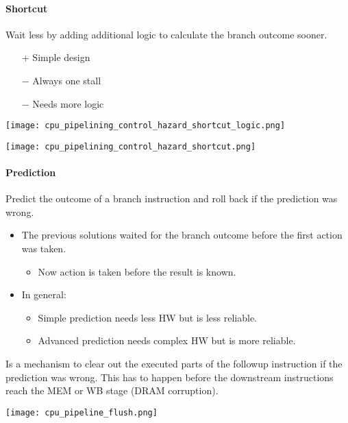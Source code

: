 \paragraph{Shortcut}\label{shortcut}

Wait less by adding additional logic to calculate the branch outcome sooner.

\begin{itemize}
    \item[+] Simple design
    \item[$-$] Always one stall
    \item[$-$] Needs more logic
\end{itemize}

\texttt{[image: cpu\_pipelining\_control\_hazard\_shortcut\_logic.png]}

\texttt{[image: cpu\_pipelining\_control\_hazard\_shortcut.png]}

\paragraph{Prediction}\label{prediction}
Predict the outcome of a branch instruction and roll back if the prediction was wrong.
\begin{itemize}
    \item The previous solutions waited for the branch outcome before the first action was taken.
    \begin{itemize}
        \item Now action is taken before the result is known.
    \end{itemize}
    \item In general: 
    \begin{itemize}
        \item Simple prediction needs less HW but is less reliable.
        \item Advanced prediction needs complex HW but is more reliable.
    \end{itemize}
\end{itemize}

\newpar{}

Is a mechanism to clear out the executed parts of the followup instruction if the prediction was wrong. This has to happen before the downstream instructions reach the MEM or WB stage (DRAM corruption).
\begin{center}
    \texttt{[image: cpu\_pipeline\_flush.png]}
\end{center}
\newpar{}

